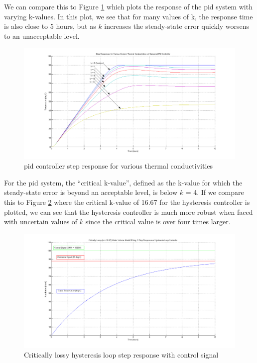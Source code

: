 \documentclass{article}
\begin{document}
\noindent We can compare this to Figure \ref{fig:pid-steps-various-k} which plots the response of the \gls{pid} system with varying k-values. In this plot, we see that for many values of k, the response time is also close to 5 hours, but as $k$ increases the steady-state error quickly worsens to an unacceptable level.

\begin{figure}[H]
\begin{center}
\includegraphics[scale=0.35]{pid-steps-various-k.png}
\caption{\gls{pid} controller step response for various thermal conductivities}
\label{fig:pid-steps-various-k}
\end{center}
\end{figure}

\noindent For the \gls{pid} system, the ``critical k-value'', defined as the k-value for which the steady-state error is beyond an acceptable level, is below $k$ = 4. If we compare this to Figure \ref{fig:hysteresis-step-critical} where the critical k-value of 16.67 for the hysteresis controller is plotted, we can see that the hysteresis controller is much more robust when faced with uncertain values of $k$ since the critical value is over four times larger.

\begin{figure}[H]
\begin{center}
\includegraphics[scale=0.35]{hysteresis-step-critical.png}
\caption{Critically lossy hysteresis loop step response with control signal}
\label{fig:hysteresis-step-critical}
\end{center}
\end{figure}
\end{document}
